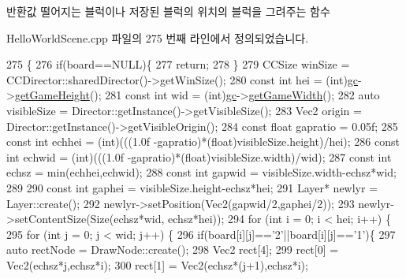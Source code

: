 \begin{DoxyReturn}{반환값}
떨어지는 블럭이나 저장된 블럭의 위치의 블럭을 그려주는 함수 
\end{DoxyReturn}


Hello\+World\+Scene.\+cpp 파일의 275 번째 라인에서 정의되었습니다.


\begin{DoxyCode}
275                                                                   \{
276     \textcolor{keywordflow}{if}(board==NULL)\{
277         \textcolor{keywordflow}{return};
278     \}
279     CCSize winSize = CCDirector::sharedDirector()->getWinSize();
280     \textcolor{keyword}{const} \textcolor{keywordtype}{int} hei = (int)\hyperlink{class_hello_world_a547cb213126911d9a7151f8259dc7102}{gc}->\hyperlink{class_tetris_1_1_game_controller_a10163479e02572450b886ff0654078b4}{getGameHeight}();
281     \textcolor{keyword}{const} \textcolor{keywordtype}{int} wid = (int)\hyperlink{class_hello_world_a547cb213126911d9a7151f8259dc7102}{gc}->\hyperlink{class_tetris_1_1_game_controller_a256cff75224efe165e1c5409c69b0503}{getGameWidth}();
282     \textcolor{keyword}{auto} visibleSize = Director::getInstance()->getVisibleSize();
283     Vec2 origin = Director::getInstance()->getVisibleOrigin();
284     \textcolor{keyword}{const} \textcolor{keywordtype}{float} gapratio = 0.05f;
285     \textcolor{keyword}{const} \textcolor{keywordtype}{int} echhei = (int)(((1.0f -gapratio)*(\textcolor{keywordtype}{float})visibleSize.height)/hei);
286     \textcolor{keyword}{const} \textcolor{keywordtype}{int} echwid =  (int)(((1.0f -gapratio)*(float)visibleSize.width)/wid);
287     \textcolor{keyword}{const} \textcolor{keywordtype}{int} echsz = min(echhei,echwid);
288     \textcolor{keyword}{const} \textcolor{keywordtype}{int} gapwid = visibleSize.width-echsz*wid;
289     
290     \textcolor{keyword}{const} \textcolor{keywordtype}{int} gaphei = visibleSize.height-echsz*hei;
291     Layer* newlyr = Layer::create();
292     newlyr->setPosition(Vec2(gapwid/2,gaphei/2));
293     newlyr->setContentSize(Size(echsz*wid, echsz*hei));
294     \textcolor{keywordflow}{for} (\textcolor{keywordtype}{int} i = 0; i < hei; i++) \{
295         \textcolor{keywordflow}{for} (\textcolor{keywordtype}{int} j = 0; j < wid; j++) \{
296             \textcolor{keywordflow}{if}(board[i][j]==\textcolor{charliteral}{'2'}||board[i][j]==\textcolor{charliteral}{'1'})\{
297             \textcolor{keyword}{auto} rectNode = DrawNode::create();
298             Vec2 rect[4];
299             rect[0] = Vec2(echsz*j,echsz*i);
300             rect[1] = Vec2(echsz*(j+1),echsz*i);

\end{DoxyCode}
